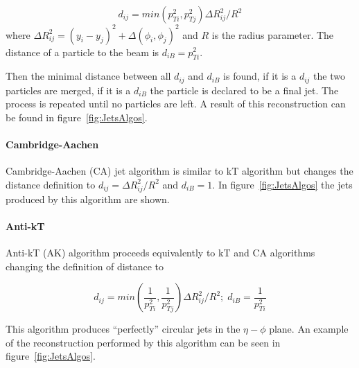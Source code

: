 \begin{equation}
  \label{eq:kt}
  d_{ij}=min(p_{Ti}^{2},p_{Tj}^{2})\Delta R_{ij}^{2}/R^{2}
\end{equation} where $\Delta R_{ij}^{2}=(y_{i}-y_{j})^{2}+\Delta(\phi_{i},\phi_{j})^{2}$ and $R$ is the radius parameter. The distance of a particle to the beam is $d_{iB}=p_{Ti}^{2}$. 

Then the minimal distance between all $d_{ij}$ and $d_{iB}$ is found, if it is a $d_{ij}$ the two particles are merged, if it is a $d_{iB}$ the particle is declared to be a final jet. The process is repeated until no particles are left. A result of this reconstruction can be found in figure~\ref{fig:JetsAlgos}. 

\paragraph{Cambridge-Aachen}

Cambridge-Aachen (CA) jet algorithm is similar to kT algorithm but changes the distance definition to $d_{ij}=\Delta R_{ij}^{2}/R^{2}$ and $d_{iB}=1$. In figure~\ref{fig:JetsAlgos} the jets produced by this algorithm are shown.

\paragraph{Anti-kT}

Anti-kT (AK) algorithm proceeds equivalently to kT and CA algorithms changing the definition of distance to

\begin{equation}
  \label{eq:antikt}
  d_{ij}=min\left(\frac{1}{p_{Ti}^{2}},\frac{1}{p_{Tj}^{2}}\right)\Delta R_{ij}^{2}/R^{2};\; d_{iB}=\frac{1}{p_{Ti}^{2}}
\end{equation} 

This algorithm produces ``perfectly'' circular jets in the $\eta-\phi$ plane. An example of the reconstruction performed by this algorithm can be seen in figure~\ref{fig:JetsAlgos}.

